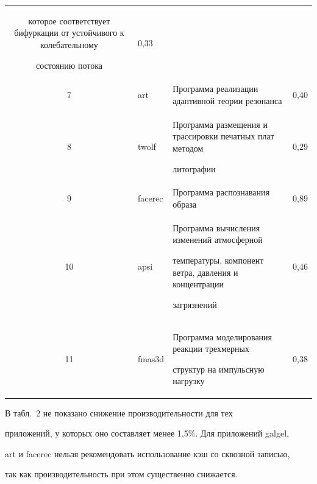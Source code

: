 \begin{table}
\begin{center}
\begin{tabular}{|c|l|p{157pt}|c|}
которое соответствует бифуркации от устойчивого к колебательному 


состоянию потока&0,33\\


7&art&Программа  реализации адап\-тивной теории резонанса&0,40\\


8&twolf&Программа размещения и трассировки  печатных плат методом 


литографии &0,29\\


9&facerec&Программа распознавания образа&0,89\\


10\hphantom{9}&apsi&Программа вычисления изменений  атмосферной 


температуры, компонент ветра, давления  и концентрации 


загрязнений&0,46\\


11\hphantom{9}&fmas3d&Программа моделирования реакции трехмерных 


структур на импульсную нагрузку&0,38\\


\hline


\end{tabular}


\end{center}


\vspace*{-9pt}


\end{table}


      


      В табл.~2 не показано снижение производительности для тех 


приложений, у которых оно составляет менее 1,5\%. Для  приложений galgel, 


art и facerec нельзя рекомендовать использование кэш  со сквозной записью, 


так как   производительность при этом существенно снижается.


      


